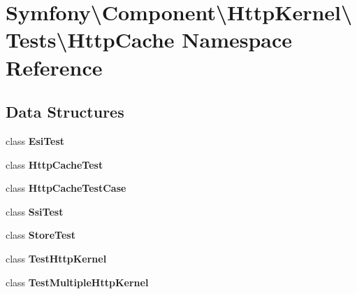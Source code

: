 \section{Symfony\textbackslash{}Component\textbackslash{}Http\+Kernel\textbackslash{}Tests\textbackslash{}Http\+Cache Namespace Reference}
\label{namespace_symfony_1_1_component_1_1_http_kernel_1_1_tests_1_1_http_cache}
\subsection*{Data Structures}
\begin{DoxyCompactItemize}
\item 
class {\bf Esi\+Test}
\item 
class {\bf Http\+Cache\+Test}
\item 
class {\bf Http\+Cache\+Test\+Case}
\item 
class {\bf Ssi\+Test}
\item 
class {\bf Store\+Test}
\item 
class {\bf Test\+Http\+Kernel}
\item 
class {\bf Test\+Multiple\+Http\+Kernel}
\end{DoxyCompactItemize}

